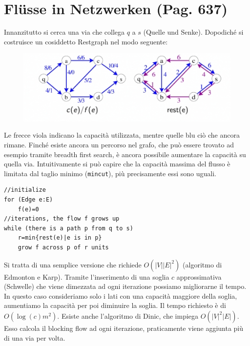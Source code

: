 \documentclass[a4paper]{book}
\newcommand{\inline}[1]{\lstinline!#1!}%
\newcommand{\lstIndent}{4}
\begin{document}
\section{Flüsse in Netzwerken (Pag. 637)}
Innanzitutto si cerca una via che collega $q$ a $s$ (Quelle und Senke). Dopodiché si costruisce un cosiddetto Restgraph nel modo seguente:
\begin{figure}[H]
\centering
\includegraphics[scale=0.8]{Figures/restgraph.jpg} 
\end{figure}
Le frecce viola indicano la capacità utilizzata, mentre quelle blu ciò che ancora rimane. Finché esiste ancora un percorso nel grafo, che può essere trovato ad esempio tramite breadth first search, è ancora possibile aumentare la capacità su quella via. Intuitivamente si può capire che la capacità massima del flusso è limitata dal taglio minimo (\inline{mincut}), più precisamente essi sono uguali.
\begin{lstlisting}[tabsize=\lstIndent]
//initialize
for (Edge e:E)
	f(e)=0
//iterations, the flow f grows up
while (there is a path p from q to s)
	r=min{rest(e)|e is in p}
	grow f across p of r units
\end{lstlisting}
Si tratta di una semplice versione che richiede $O(|V||E|^2)$ (algoritmo di Edmonton e Karp). Tramite l'inserimento di una soglia $c$ approssimativa (Schwelle) che viene dimezzata ad ogni iterazione possiamo migliorarne il tempo. In questo caso consideriamo solo i lati con una capacità maggiore della soglia, aumentiamo la capacità per poi diminuire la soglia. Il tempo richiesto è di $O(\log (c)m^2)$. Esiste anche l'algoritmo di Dinic, che impiega $O(|V|^2|E|)$. Esso calcola il blocking flow ad ogni iterazione, praticamente viene aggiunta più di una via per volta.
\end{document}
